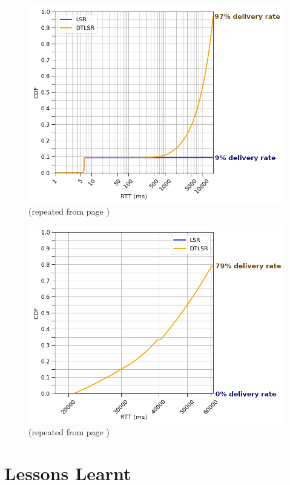 \documentclass[withindex,glossary,openany]{cam-thesis}
\newcommand{\repeatcaption}[2]{%
  \renewcommand{\thefigure}{\ref{#1}}%
  \captionsetup{list=no}%
  \caption{#2 (repeated from page \pageref{#1})}%
  \addtocounter{figure}{-1}%
}
\begin{document}
\begin{minipage}{1\textwidth}

\begin{figure}[H]
  \centering
  \hspace*{2.4cm}
  \includegraphics[width=0.8\linewidth]{delay_partition_flap2_20}
  \repeatcaption{fig:partition_2_18}{}
\end{figure}

\begin{figure}[H]
  \centering
  \hspace*{2.4cm}
  \includegraphics[width=0.8\linewidth]{delay_full_partition_flap20}
  \repeatcaption{fig:full_partition_flap20}{}
\end{figure}

\end{minipage}


\section{Lessons Learnt}
\end{document}
